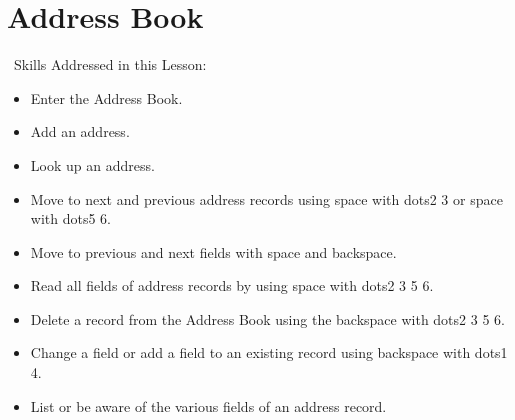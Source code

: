\documentclass[10pt,letterpaper,twoside]{report}
\begin{document}
{{{%
\clearpage
\section{ Address Book}
\
Skills Addressed in this Lesson:
\begin{itemize}
	\item Enter the Address Book.
	\item Add an address.
	\item Look up an address.
	\item Move to next and previous address records using space with dots2 3 or space with dots5 6.
	\item Move to previous and next fields with space and backspace.
	\item Read all fields of address records by using space with dots2 3 5 6.
	\item Delete a record from the Address Book using the backspace with dots2 3 5 6.
	\item Change a field or add a field to an existing record using backspace with dots1 4.
	\item List or be aware of the various fields of an address record.
\end{itemize}
}}}
\end{document}

